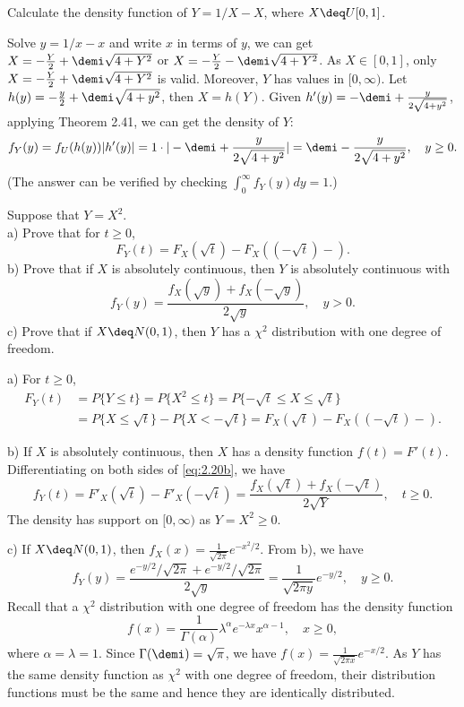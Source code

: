 \begin{exercise}
  Calculate the density function of $Y=1/X - X$, where $X\deq U[0, 1]$.
\end{exercise}
\begin{solution}
  Solve $y=1/x - x$ and write $x$ in terms of $y$, we can get $X = -\frac{Y}{2} + \demi\sqrt{4+Y^2}$ or $X = -\frac{Y}{2} - \demi\sqrt{4+Y^2}$. As $X\in[0, 1]$, only $X = -\frac{Y}{2} + \demi\sqrt{4+Y^2}$ is valid. Moreover, $Y$ has values in $[0, \infty)$. Let $h(y)=-\frac{y}{2} + \demi\sqrt{4+y^2}$, then $X=h(Y)$. Given $h'(y)=-\demi + \frac{y}{2\sqrt{4+y^2}}$, applying Theorem 2.41, we can get the density of $Y$:
  \[
    f_Y(y) = f_U(h(y))|h'(y)| = 1\cdot |-\demi+\frac{y}{2\sqrt{4+y^2}}| = \demi - \frac{y}{2\sqrt{4+y^2}}, \quad y\geq 0.
  \]
  (The answer can be verified by checking $\int_0^\infty f_Y(y)dy = 1$.)
\end{solution}


\begin{exercise}
  Suppose that $Y=X^2$. \\
  a) Prove that for $t\geq 0$,
  \[ F_Y(t) = F_X(\sqrt{t}) - F_X((-\sqrt{t})-). \]
  b) Prove that if $X$ is absolutely continuous, then $Y$ is absolutely continuous with
  \[ f_Y(y) = \frac{f_X(\sqrt{y}) + f_X(-\sqrt{y})}{2\sqrt{y}}, \quad y>0. \]
  c) Prove that if $X\deq N(0, 1)$, then $Y$ has a $\chi^2$ distribution with one degree of freedom.
\end{exercise}
\begin{solution}
  a) For $t\geq 0$,
  \begin{align}\label{eq:2.20b}
    F_Y(t) &= P\{Y\leq t\} = P\{X^2\leq t\} = P\{-\sqrt{t}\leq X\leq\sqrt{t}\} \\
      &= P\{X\leq\sqrt{t}\} - P\{X<-\sqrt{t}\} = F_X(\sqrt{t}) - F_X((-\sqrt{t})-) .
  \end{align}

  b) If $X$ is absolutely continuous, then $X$ has a density function $f(t)=F'(t)$. Differentiating on both sides of \eqref{eq:2.20b}, we have
  \[ f_Y(t) = F'_X(\sqrt{t}) - F'_X(-\sqrt{t}) = \frac{f_X(\sqrt{t})+f_X(-\sqrt{t})}{2\sqrt{Y}} , \quad t\geq 0. \]
  The density has support on $[0,\infty)$ as $Y= X^2\geq 0$.

  c) If $X\deq N(0, 1)$, then $f_X(x)=\frac{1}{\sqrt{2\pi}}e^{-x^2/2}$. From b), we have
  \[ f_Y(y) = \frac{e^{-y/2}/\sqrt{2\pi}+e^{-y/2}/\sqrt{2\pi}}{2\sqrt{y}} = \frac{1}{\sqrt{2\pi y}}e^{-y/2} ,\quad y\geq 0 .\]
  Recall that a $\chi^2$ distribution with one degree of freedom has the density function
  \[ f(x)=\frac{1}{\Gamma(\alpha)}\lambda^\alpha e^{-\lambda x}x^{\alpha-1} ,\quad x\geq 0, \]
  where $\alpha = \lambda = 1$. Since $\Gamma(\demi) = \sqrt{\pi}$, we have $f(x) = \frac{1}{\sqrt{2\pi x}}e^{-x/2}$. As $Y$ has the same density function as $\chi^2$ with one degree of freedom, their distribution functions must be the same and hence they are identically distributed.
\end{solution}
